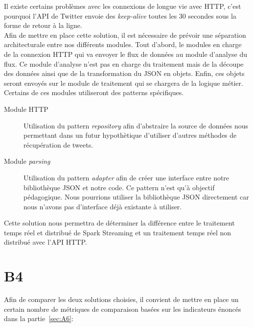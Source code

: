   Il existe certains problèmes avec les connexions de longue vie avec HTTP, c'est pourquoi l'API de Twitter envoie des \textit{keep-alive} toutes les 30 secondes sous la forme de retour à la ligne.\\

  Afin de mettre en place cette solution, il est nécessaire de prévoir une séparation architecturale entre nos différents modules. Tout d'abord, le modules en charge de la connexion HTTP qui va envoyer le flux de données au module d'analyse du flux. Ce module d'analyse n'est pas en charge du traitement mais de la découpe des données ainsi que de la transformation du JSON en objets. Enfin, ces objets seront envoyés sur le module de traitement qui se chargera de la logique métier.\\

  Certains de ces modules utiliseront des patterns spécifiques.
  \begin{description}
    \item[Module HTTP] Utilisation du pattern \textit{repository} afin d'abstraire la source de données nous permettant dans un futur hypothètique d'utiliser d'autres méthodes de récupération de tweets.
    \item[Module \textit{parsing}] Utilisation du pattern \textit{adapter} afin de créer une interface entre notre bibliothèque JSON et notre code. Ce pattern n'est qu'à objectif pédagogique. Nous pourrions utiliser la bibliothèque JSON directement car nous n'avons pas d'interface déjà existante à utiliser.
  \end{description}

  Cette solution nous permettra de déterminer la différence entre le traitement temps réel et distribué de Spark Streaming et un traitement temps réel non distribué avec l'API HTTP.


\section{B4}
\label{sec:B4}
  Afin de comparer les deux solutions choisies, il convient de mettre en place un certain nombre de métriques de comparaison basées sur les indicateurs énoncés dans la partie~\ref{sec:A6}:

